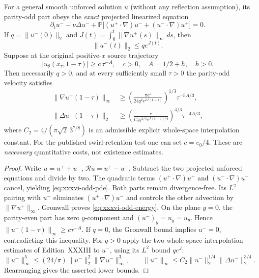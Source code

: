 \begin{theorem}
\label{thm:xxxvi-odd-transport}
For a general smooth unforced solution $u$ (without
any reflection assumption), its parity-odd part obeys
the \emph{exact} projected linearized equation
\begin{equation}\label{eq:xxxvi-odd-pde}
\boxed{\quad
\partial_tu^{-}-\nu\Delta u^{-}
+\mathbb P\big[(u^{+}\cdot\nabla)u^{-}
+(u^{-}\cdot\nabla)u^{+}\big]=0.
\quad}
\end{equation}
If $q=\|u^{-}(0)\|_2$ and
$J(t)=\int_0^t\|\nabla u^{+}(s)\|_\infty\,ds$,
then
\begin{equation}\label{eq:xxxvi-odd-energy}
\boxed{\quad\|u^{-}(t)\|_2\le q e^{J(t)}.\quad}
\end{equation}
Suppose at the original positive-$x$ source trajectory
\[
|u_\theta(x_\tau,1-\tau)|
\ge c\,\tau^{-A},\quad
c>0,\quad A=1/2+h,\quad h>0.
\]
Then necessarily $q>0$, and at every sufficiently
small $\tau>0$ the parity-odd velocity satisfies
\begin{align}
\|\nabla u^{-}(1-\tau)\|_\infty
&\ge\left(\frac{\pi c^5}
{24q^2e^{2J(1-\tau)}}\right)^{1/3}
\tau^{-5A/3},
\label{eq:xxxvi-odd-gradient}\\
\|\Delta u^{-}(1-\tau)\|_2
&\ge\left(\frac{c}
{C_2q^{1/4}e^{J(1-\tau)/4}}\right)^{4/3}
\tau^{-4A/3},
\label{eq:xxxvi-odd-h2}
\end{align}
where $C_2=4/(\pi\sqrt2\,3^{7/8})$ is an
admissible explicit whole-space interpolation constant.
For the published swirl-retention test one can set
$c=e_0/4$. These are \emph{necessary}
quantitative costs, not existence estimates.
\end{theorem}
\begin{proof}
Write $u=u^{+}+u^{-}$,
$\mathscr Ru=u^{+}-u^{-}$.
Subtract the two projected unforced equations
and divide by two. The quadratic terms
$(u^+\cdot\nabla)u^+$ and
$(u^-\cdot\nabla)u^-$ cancel, yielding
\eqref{eq:xxxvi-odd-pde}.
Both parts remain divergence-free.
Its $L^2$ pairing with $u^-$ eliminates
$(u^+\cdot\nabla)u^-$ and controls the other
advection by $\|\nabla u^{+}\|_\infty$.
Gronwall proves \eqref{eq:xxxvi-odd-energy}.
On the plane $y=0$, the parity-even part has
zero $y$-component and $(u^{-})_y=u_y=u_\theta$.
Hence $\|u^{-}(1-\tau)\|_\infty\ge c\tau^{-A}$.
If $q=0$, the Gronwall bound implies $u^-=0$,
contradicting this inequality. For $q>0$ apply
the two whole-space interpolation estimates
of Edition~XXXIII to $u^-$,
using its $L^2$ bound $qe^J$:
\[
\|u^-\|_\infty^5\le
(24/\pi)\|u^-\|_2^2\|\nabla u^-\|_\infty^3,\qquad
\|u^-\|_\infty\le
C_2\|u^-\|_2^{1/4}\|\Delta u^-\|_2^{3/4}.
\]
Rearranging gives the asserted lower bounds.
\end{proof}

